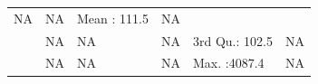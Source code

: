 \documentclass[]{article}
\begin{document}
\begin{longtable}[]{@{}llllll@{}}
\begin{minipage}[t]{0.16\columnwidth}
NA\strut
\end{minipage} & \begin{minipage}[t]{0.16\columnwidth}\raggedright\strut
NA\strut
\end{minipage} & \begin{minipage}[t]{0.14\columnwidth}\raggedright\strut
Mean : 111.5\strut
\end{minipage} & \begin{minipage}[t]{0.16\columnwidth}\raggedright\strut
NA\strut
\end{minipage}\tabularnewline
\begin{minipage}[t]{0.04\columnwidth}\raggedright\strut
\strut
\end{minipage} & \begin{minipage}[t]{0.16\columnwidth}\raggedright\strut
NA\strut
\end{minipage} & \begin{minipage}[t]{0.16\columnwidth}\raggedright\strut
NA\strut
\end{minipage} & \begin{minipage}[t]{0.16\columnwidth}\raggedright\strut
NA\strut
\end{minipage} & \begin{minipage}[t]{0.14\columnwidth}\raggedright\strut
3rd Qu.: 102.5\strut
\end{minipage} & \begin{minipage}[t]{0.16\columnwidth}\raggedright\strut
NA\strut
\end{minipage}\tabularnewline
\begin{minipage}[t]{0.04\columnwidth}\raggedright\strut
\strut
\end{minipage} & \begin{minipage}[t]{0.16\columnwidth}\raggedright\strut
NA\strut
\end{minipage} & \begin{minipage}[t]{0.16\columnwidth}\raggedright\strut
NA\strut
\end{minipage} & \begin{minipage}[t]{0.16\columnwidth}\raggedright\strut
NA\strut
\end{minipage} & \begin{minipage}[t]{0.14\columnwidth}\raggedright\strut
Max. :4087.4\strut
\end{minipage} & \begin{minipage}[t]{0.16\columnwidth}\raggedright\strut
NA\strut
\end{minipage}\tabularnewline
\bottomrule
\end{longtable}
\end{document}
